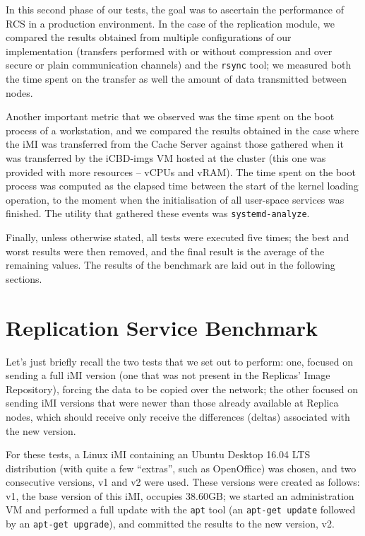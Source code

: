 In this second phase of our tests, the goal was to ascertain the performance of RCS in a production environment. In the case of the replication module, we compared the results obtained from multiple configurations of our implementation (transfers performed with or without compression and over secure or plain communication channels) and the \texttt{rsync} tool; we measured both the time spent on the transfer as well the amount of data transmitted between nodes.

Another important metric that we observed was the time spent on the boot process of a workstation, and we compared the results obtained in the case where the iMI was transferred from the Cache Server against those gathered when it was transferred by the iCBD-imgs VM hosted at the cluster (this one was provided with more resources – vCPUs and vRAM). The time spent on the boot process was computed as the elapsed time between the start of the kernel loading operation, to the moment when the initialisation of all user-space services was finished. The utility that gathered these events was \texttt{systemd-analyze}.

Finally, unless otherwise stated, all tests were executed five times; the best and worst results were then removed, and the final result is the average of the remaining values. The results of the benchmark are laid out in the following sections.


\section{Replication Service Benchmark}
\label{sec:eval_rep_bench}

Let’s just briefly recall the two tests that we set out to perform: one, focused on sending a full iMI version (one that was not present in the Replicas’ Image Repository), forcing the data to be copied over the network; the other focused on sending iMI versions that were newer than those already available at Replica nodes, which should receive only receive the differences (deltas) associated with the new version.

For these tests, a Linux iMI containing an Ubuntu Desktop 16.04 LTS distribution (with quite a few “extras”, such as OpenOffice) was chosen, and two consecutive versions, v1 and v2 were used. These versions were created as follows: v1, the base version of this iMI, occupies 38.60GB; we started an administration VM and performed a full update with the \texttt{apt} tool (an \texttt{apt-get update} followed by an \texttt{apt-get upgrade}), and committed the results to the new version, v2.

